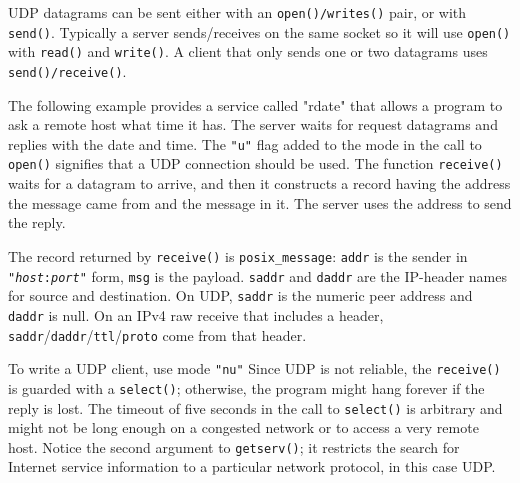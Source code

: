 UDP datagrams can be sent either with an \texttt{open()/writes()}
pair, or with \texttt{send()}. Typically a server sends/receives on the
same socket so it will use \texttt{open()} with \texttt{read()} and
\texttt{write()}. A client that only sends one or two datagrams uses
\texttt{send()}\texttt{/}\texttt{receive()}.

The following example provides a service called
"rdate" that allows a program to ask a
remote host what time it has. The server waits for request datagrams
and replies with the date and time. The
\texttt{"u"} flag added to the mode in the
call to \texttt{open()} signifies that a UDP connection should be used.
The function \texttt{receive()} waits for a datagram to arrive, and
then it constructs a record having the address the message came from
and the message in it. The server uses the address to send the reply.


The record returned by \texttt{receive()} is
\texttt{posix\_message}: \texttt{addr} is the sender in
\texttt{"}\texttt{\textit{host}}\texttt{:}\texttt{\textit{port}}\texttt{"}
form, \texttt{msg} is the payload. \texttt{saddr} and
\texttt{daddr} are the IP-header names for source and destination.
On UDP, \texttt{saddr} is the numeric peer address and
\texttt{daddr} is null. On an IPv4 raw receive that includes a
header, \texttt{saddr}/\texttt{daddr}/\texttt{ttl}/\texttt{proto}
come from that header.

To write a UDP client, use mode \texttt{"nu"}
Since UDP is not reliable, the \texttt{receive()} is guarded
with a \texttt{select()}; otherwise, the program might hang forever if
the reply is lost. The timeout of five seconds in the call to
\texttt{select()} is arbitrary and might not be long enough on a
congested network or to access a very remote host. Notice the second
argument to \texttt{getserv()}; it restricts the search for Internet
service information to a particular network protocol, in this case UDP.

